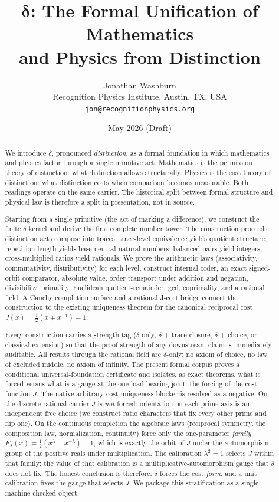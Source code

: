 \documentclass[11pt,a4paper]{article}
\title{%
  $\boldsymbol{\delta}$: The Formal Unification of Mathematics\\
  and Physics from Distinction}
\author{%
  Jonathan Washburn\\
  Recognition Physics Institute, Austin, TX, USA\\
  \texttt{jon@recognitionphysics.org}}
\date{May 2026 \quad (Draft)}
\theoremstyle{definition}
\theoremstyle{remark}
\begin{document}
\maketitle

\begin{abstract}\sloppy
We introduce $\delta$, pronounced \emph{distinction}, as a formal foundation in
which mathematics and physics factor through a single primitive act.
Mathematics is the permission theory of distinction: what distinction allows
structurally. Physics is the cost theory of distinction: what distinction costs
when comparison becomes measurable. Both readings operate on the same carrier.
The historical split between formal structure and physical law is therefore a
split in presentation, not in source.

Starting from a single primitive (the act of marking a difference), we
construct the finite $\delta$ kernel and derive the first complete number tower.
The construction proceeds: distinction acts compose into traces; trace-level
equivalence yields quotient structure; repetition length yields base-neutral
natural numbers; balanced pairs yield integers; cross-multiplied ratios yield
rationals. We prove the arithmetic laws (associativity, commutativity,
distributivity) for each level, construct internal order, an exact
signed-orbit comparator, absolute value, order transport under addition and
negation, divisibility, primality, Euclidean quotient-remainder, gcd,
coprimality, and a rational field. A Cauchy completion surface and a rational
J-cost bridge connect the construction to the existing uniqueness theorem for
the canonical reciprocal cost $J(x) = \tfrac{1}{2}(x + x^{-1}) - 1$.

Every construction carries a strength tag ($\delta$-only, $\delta$ + trace
closure, $\delta$ + choice, or classical extension) so that the proof strength
of any downstream claim is immediately auditable. All results through the
rational field are $\delta$-only: no axiom of choice, no law of excluded
middle, no axiom of infinity. The present formal corpus proves a conditional
universal-foundation certificate and isolates, as exact theorems, what is forced
versus what is a gauge at the one load-bearing joint: the forcing of the cost
function $J$. The native arbitrary-cost uniqueness blocker is resolved as a
negative. On the discrete rational carrier $J$ is \emph{not} forced: orientation
on each prime axis is an independent free choice (we construct ratio characters
that fix every other prime and flip one). On the continuous completion the
algebraic laws (reciprocal symmetry, the composition law, normalization,
continuity) force only the one-parameter \emph{family}
$F_\lambda(x) = \tfrac{1}{2}(x^\lambda + x^{-\lambda}) - 1$, which is exactly the
orbit of $J$ under the automorphism group of the positive reals under
multiplication. The calibration $\lambda^2 = 1$ selects $J$ within that family;
the value of that calibration is a multiplicative-automorphism gauge that
$\delta$ does not fix. The honest conclusion is therefore: $\delta$ forces the
cost \emph{form}, and a unit calibration fixes the gauge that selects $J$. We
package this stratification as a single machine-checked object.


\end{abstract}
\end{document}
